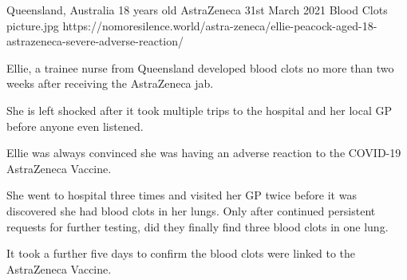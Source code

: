 {Queensland, Australia}
{18 years old}
{AstraZeneca}
{31st March 2021}
{Blood Clots}
{picture.jpg}
{https://nomoresilence.world/astra-zeneca/ellie-peacock-aged-18-astrazeneca-severe-adverse-reaction/}
{

Ellie, a trainee nurse from Queensland developed blood clots no more than two
weeks after receiving the AstraZeneca jab.

She is left shocked after it took multiple trips to the hospital and her local
GP before anyone even listened.

Ellie was always convinced she was having an adverse reaction to the COVID-19
AstraZeneca Vaccine.

She went to hospital three times and visited her GP twice before it was
discovered she had blood clots in her lungs. Only after continued persistent
requests for further testing, did they finally find three blood clots in one
lung.

It took a further five days to confirm the blood clots were linked to the
AstraZeneca Vaccine.

}
